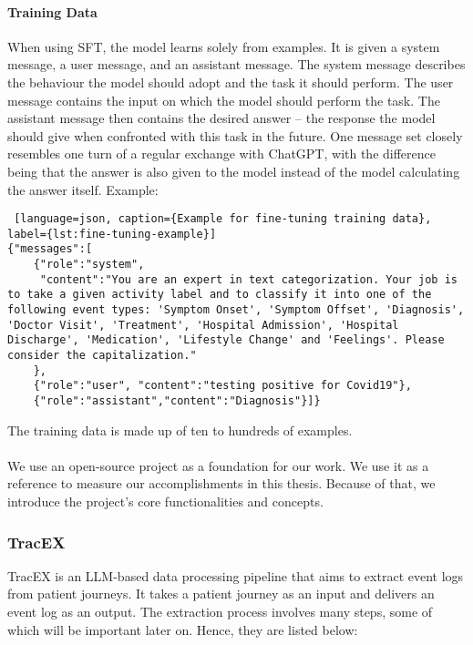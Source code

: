 \paragraph{Training Data}
When using SFT, the model learns solely from examples. It is given a system message, a user message, and an assistant message. The system message describes the behaviour the model should adopt and the task it should perform. The user message contains the input on which the model should perform the task. The assistant message then contains the desired answer – the response the model should give when confronted with this task in the future.
One message set closely resembles one turn of a regular exchange with ChatGPT, with the difference being that the answer is also given to the model instead of the model calculating the answer itself.
Example:
\begin{lstlisting} [language=json, caption={Example for fine-tuning training data}, label={lst:fine-tuning-example}]   
{"messages":[
    {"role":"system",
     "content":"You are an expert in text categorization. Your job is to take a given activity label and to classify it into one of the following event types: 'Symptom Onset', 'Symptom Offset', 'Diagnosis', 'Doctor Visit', 'Treatment', 'Hospital Admission', 'Hospital Discharge', 'Medication', 'Lifestyle Change' and 'Feelings'. Please consider the capitalization."
    },
    {"role":"user", "content":"testing positive for Covid19"},
    {"role":"assistant","content":"Diagnosis"}]}
\end{lstlisting}
The training data is made up of ten to hundreds of examples.\\\\
We use an open-source project as a foundation for our work. We use it as a reference to measure our accomplishments in this thesis. Because of that, we introduce the project's core functionalities and concepts.

\subsubsection*{TracEX}\label{sec:tracex}
TracEX is an LLM-based data processing pipeline that aims to extract event logs from patient journeys. It takes a patient journey as an input and delivers an event log as an output. The extraction process involves many steps, some of which will be important later on. Hence, they are listed below:
